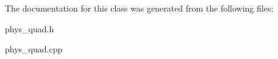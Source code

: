 The documentation for this class was generated from the following files:\begin{DoxyCompactItemize}
\item 
phys\_\-quad.h\item 
phys\_\-quad.cpp\end{DoxyCompactItemize}
